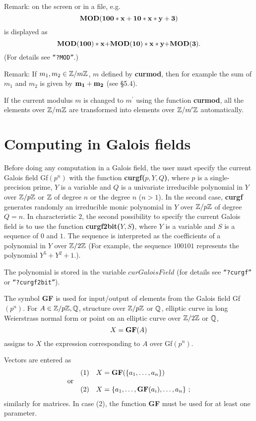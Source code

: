 Remark: on the screen or in a file, e.g.
$$
{\rm {\bf MOD}}{\bf (100*x+10*x*y+3)}
$$
is displayed as
$$
{\rm {\bf MOD}}{\bf (100)*x+}{\rm {\bf MOD}}{\bf (10)*x*y+}{\rm {\bf MOD}}{\bf (3)}.
$$
(For details see {\tt ``?MOD''}.)

Remark: If $m_1, m_2 \in \mbox{$\mathbb Z$} /m\mbox{$\mathbb Z$} $, $m$ defined by {\bf curmod},
then for example the sum of $m_1$ and $m_2$ is given by {${\bf m_1 + m_2}$} (see \S 5.4).

If the current modulus $m$ is changed to $m^{\prime }$ using the function {\bf curmod},
all the elements over $\mbox{$\mathbb Z$} /m\mbox{$\mathbb Z$} $ are transformed into elements over $\mbox{$\mathbb Z$} /m^{\prime }\mbox{$\mathbb Z$}$
automatically.



\section{Computing in Galois fields}
Before doing any computation in a Galois field, the user must specify 
the current Galois field Gf$(p^n)$ with the function {\bf curgf($p, Y, Q$)},
where $p$ is a single-precision prime, $Y$ is a variable and $Q$ is a
univariate irreducible polynomial in $Y$ over $\mbox{$\mathbb Z$}/p\mbox{$\mathbb Z$}$ or $\mbox{$\mathbb Z$}$ of degree $n$
or the degree $n$ ($n > 1$). In the second case, {\bf curgf} generates randomly
an irreducible monic polynomial in $Y$ over $\mbox{$\mathbb Z$}/p\mbox{$\mathbb Z$}$ of degree $Q = n$.
In characteristic $2$, the second possibility to specify the current Galois
field is to use the function {\bf curgf2bit($Y, S$)}, where $Y$ is a
variable and $S$ is a sequence of $0$ and $1$. The sequence is interpreted as
the coefficients of a polynomial in $Y$ over $\mbox{$\mathbb Z$}/2\mbox{$\mathbb Z$}$ (For example, the sequence
$100101$ represents the polynomial $Y^5+Y^2+1$.).

The polynomial is stored in the variable $curGaloisField$ (for details see 
{\tt ``?curgf''} or {\tt ``?curgf2bit''}).

The symbol {\bf GF} is used for input/output of elements from the Galois field Gf$(p^n)$.
For $A \in \mbox{$\mathbb Z$}/p\mbox{$\mathbb Z$}, \mbox{$\mathbb Q$}$, structure over $\mbox{$\mathbb Z$}/p\mbox{$\mathbb Z$}$ or $\mbox{$\mathbb Q$}$, elliptic curve in long Weierstrass
normal form or point on an elliptic curve over $\mbox{$\mathbb Z$}/2\mbox{$\mathbb Z$}$ or $\mbox{$\mathbb Q$}$,
$$
X = \mbox{\bf GF}(A)
$$
assigns to $X$ the expression corresponding to $A$ over Gf$(p^n)$.

Vectors are entered as
$$\begin{array}{lrl}
 & (1) & X = \mbox{\bf GF}(\{a_1,\ldots,a_n\})\\
\mbox{or} & & \\
 & (2) & X = \{a_1,\ldots,\mbox{\bf GF}(a_i),\ldots,a_n\}\ ;
\end{array}$$
similarly for matrices. In case (2), the function {\bf GF} must be used for at least
one parameter.

